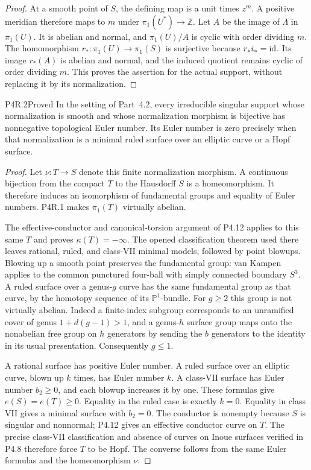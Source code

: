 \begin{proof}
At a smooth point of $S$, the defining map is a unit times
$z^m$. A positive meridian therefore maps to $m$ under
$\pi_1(U^*)\to\mathbb Z$. Let $A$ be the image of $\Lambda$
in $\pi_1(U)$. It is abelian and normal, and
$\pi_1(U)/A$ is cyclic with order dividing $m$.
The homomorphism $r_*:\pi_1(U)\to\pi_1(S)$ is surjective
because $r_*i_*=\mathrm{id}$. Its image $r_*(A)$ is abelian and
normal, and the induced quotient remains cyclic of order
dividing $m$. This proves the assertion for the actual support,
without replacing it by its normalization.
\end{proof}



\begin{statement}{P4R.2}{Proved}
In the setting of Part~4.2, every irreducible singular support
whose normalization is smooth and whose normalization morphism
is bijective has nonnegative topological Euler number.
Its Euler number is zero precisely when that normalization is
a minimal ruled surface over an elliptic curve or a Hopf surface.
\end{statement}
\begin{proof}
Let $\nu:T\to S$ denote this finite normalization morphism.
A continuous bijection from the compact $T$ to the Hausdorff
$S$ is a homeomorphism. It therefore induces an isomorphism
of fundamental groups and equality of Euler numbers. P4R.1
makes $\pi_1(T)$ virtually abelian.

The effective-conductor and canonical-torsion argument of
P4.12 applies to this same $T$ and proves $\kappa(T)=-\infty$.
The opened classification theorem used there leaves rational,
ruled, and class-VII minimal models, followed by point blowups.
Blowing up a smooth point preserves the fundamental group:
van Kampen applies to the common punctured four-ball with
simply connected boundary $S^3$. A ruled surface over a
genus-$g$ curve has the same fundamental group as that curve,
by the homotopy sequence of its $\mathbb P^1$-bundle.
For $g\ge2$ this group is not virtually abelian. Indeed a
finite-index subgroup corresponds to an unramified cover
of genus $1+d(g-1)>1$, and a genus-$h$ surface group maps
onto the nonabelian free group on $h$ generators by sending
the $b$ generators to the identity in its usual presentation.
Consequently $g\le1$.

A rational surface has positive Euler number. A ruled surface
over an elliptic curve, blown up $k$ times, has Euler number
$k$. A class-VII surface has Euler number $b_2\ge0$, and
each blowup increases it by one. These formulas give
$e(S)=e(T)\ge0$. Equality in the ruled case is exactly
$k=0$. Equality in class VII gives a minimal surface with
$b_2=0$. The conductor is nonempty because $S$ is singular
and nonnormal; P4.12 gives an effective conductor curve on
$T$. The precise class-VII classification and absence of
curves on Inoue surfaces verified in P4.8 therefore force
$T$ to be Hopf. The converse follows from the same Euler
formulas and the homeomorphism $\nu$.
\end{proof}

